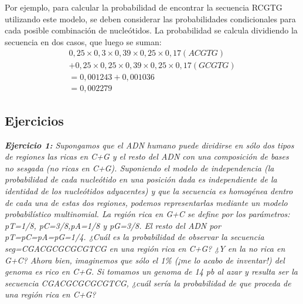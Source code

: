 Por ejemplo, para calcular la probabilidad de encontrar la secuencia RCGTG utilizando este modelo, se deben considerar las probabilidades condicionales para cada posible combinación de nucleótidos. La probabilidad se calcula dividiendo la secuencia en dos casos, que luego se suman:
\begin{align*}
0,25 \times 0,3 \times 0,39 \times 0,25 \times 0,17 (ACGTG) \\
+ 0,25 \times 0,25 \times 0,39 \times 0,25 \times 0,17 (GCGTG) \\
= 0,001243 + 0,001036 \\
= 0,002279 
\end{align*}
 
\subsection{Ejercicios}
\textit{\textbf{Ejercicio 1:} 
Supongamos que el ADN humano puede dividirse en sólo dos tipos de regiones las ricas en C+G y el resto del ADN con una composición de bases no sesgada (no ricas en C+G). Suponiendo el modelo de independencia (la probabilidad de cada nucleótido en una posición dada es independiente de la identidad de los nucleótidos adyacentes) y que la secuencia es homogénea dentro de cada una de estas dos regiones, podemos representarlas mediante un modelo probabilístico multinomial. La región rica en G+C se define por los parámetros: pT=1/8, pC=3/8,pA=1/8 y pG=3/8. El resto del ADN por pT=pC=pA=pG=1/4. ¿Cuál es la probabilidad de observar la secuencia seg=CGACGCGCGCGTCG en una región rica en C+G? ¿Y en la no rica en G+C? Ahora bien, imaginemos que sólo el 1\% (¡me lo acabo de inventar!) del genoma es rico en C+G. Si tomamos un genoma de 14 pb al azar y resulta ser la secuencia CGACGCGCGCGTCG, ¿cuál sería la probabilidad de que proceda de una región rica en C+G?}
